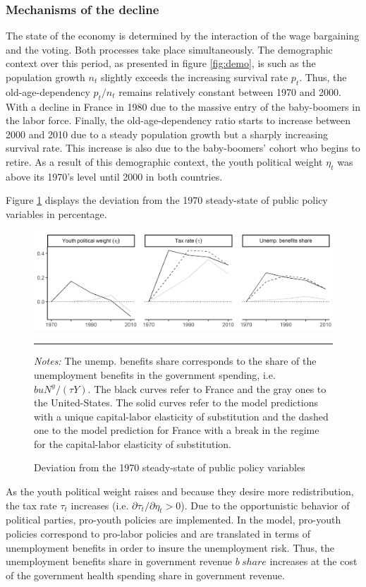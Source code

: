 \subsubsection{Mechanisms of the decline}

The state of the economy is determined by the interaction of the wage bargaining and the voting. Both processes take place simultaneously. The demographic context over this period, as presented in figure \ref{fig:demo}, is such as the population growth $n_t$ slightly exceeds the increasing survival rate $p_t$. Thus, the old-age-dependency $p_t/n_t$ remains relatively constant between 1970 and 2000. With a decline in France in 1980 due to the massive entry of the baby-boomers in the labor force. Finally, the old-age-dependency ratio starts to increase between 2000 and 2010 due to a steady population growth but a sharply increasing survival rate. This increase is also due to the baby-boomers' cohort who begins to retire. As a result of this demographic context, the youth political weight $\eta_t$ was above its 1970's level until 2000 in both countries.

Figure \ref{fig:dev_public7010} displays the deviation from the 1970 steady-state of public policy variables in percentage.
\begin{figure}[tb]
	\centering
	\includegraphics[width=1\linewidth]{../result/deviation/dev_public7010.png}
	\caption{Deviation from the 1970 steady-state of public policy variables}
	\label{fig:dev_public7010}
	\vspace{.5ex}
	\hrule
	\vspace{-4ex}
 	\justify\singlespacing\footnotesize \textit{Notes:} The unemp. benefits share corresponds to the share of the unemployment benefits in the government spending, i.e. $buN^y/(\tau Y)$. The black curves refer to France and the gray ones to the United-States. The solid curves refer to the model predictions with a unique capital-labor elasticity of substitution and the dashed one to the model prediction for France with a break in the regime for the capital-labor elasticity of substitution.
\end{figure}
As the youth political weight raises and because they desire more redistribution, the tax rate $\tau_t$ increases (i.e. $\partial \tau_t / \partial \eta_t > 0$). Due to the opportunistic behavior of political parties, pro-youth policies are implemented. In the model, pro-youth policies correspond to pro-labor policies and are translated in terms of unemployment benefits in order to insure the unemployment risk. Thus, the unemployment benefits share in government revenue $b~share$ increases at the cost of the government health spending share in government revenue.

